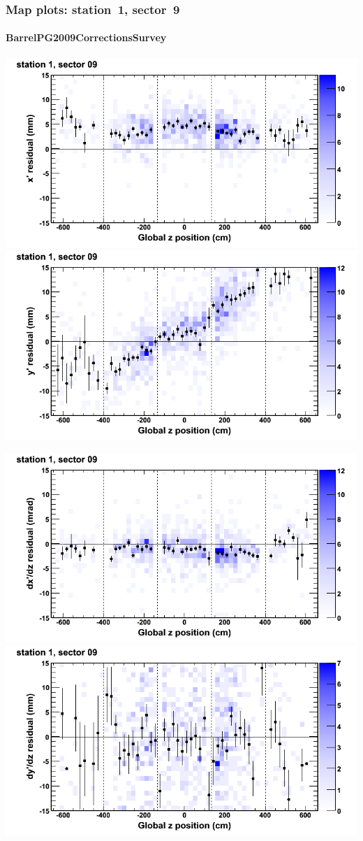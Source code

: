\documentclass[compress]{beamer}
\begin{document}
\begin{frame}
\frametitle{Map plots: station~1, sector~9}
\framesubtitle{BarrelPG2009CorrectionsSurvey}
\includegraphics[width=0.5\linewidth]{mapplots_01/DTvsz_st1sec09_x.png}
\includegraphics[width=0.5\linewidth]{mapplots_01/DTvsz_st1sec09_y.png}

\includegraphics[width=0.5\linewidth]{mapplots_01/DTvsz_st1sec09_dxdz.png}
\includegraphics[width=0.5\linewidth]{mapplots_01/DTvsz_st1sec09_dydz.png}
\end{frame}
\end{document}
